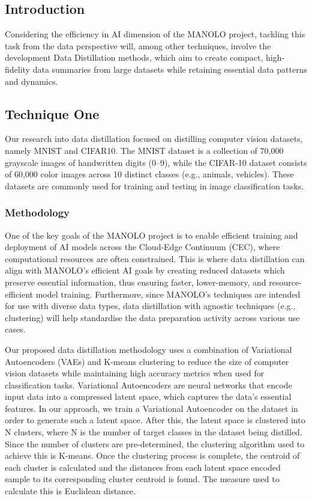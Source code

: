 \subsection{Introduction}
Considering the efficiency in AI dimension of the MANOLO project, tackling this task from the data perspective will, among other techniques, involve the development Data Distillation methods, which aim to create compact, high-fidelity data summaries from large datasets while retaining essential data patterns and dynamics.

\subsection{Technique One}
Our research into data distillation focused on distilling computer vision datasets, namely MNIST and CIFAR10. The MNIST dataset is a collection of 70,000 grayscale images of handwritten digits (0–9), while the CIFAR-10 dataset consists of 60,000 color images across 10 distinct classes (e.g., animals, vehicles). These datasets are commonly used for training and testing in image classification tasks.
\label{subsec:2.3_datdist_tech1}

\subsubsection{Methodology}

One of the key goals of the MANOLO project is to enable efficient training and deployment of AI models across the Cloud-Edge Continuum (CEC), where computational resources are often constrained. This is where data distillation can align with MANOLO’s efficient AI goals by creating reduced datasets which preserve essential information, thus ensuring faster, lower-memory, and resource-efficient model training. Furthermore, since MANOLO’s techniques are intended for use with diverse data types, data distillation with agnostic techniques (e.g., clustering) will help standardise the data preparation activity across various use cases. 

Our proposed data distillation methodology uses a combination of Variational Autoencoders (VAEs) and K-means clustering to reduce the size of computer vision datasets while maintaining high accuracy metrics when used for classification tasks. Variational Autoencoders are neural networks that encode input data into a compressed latent space, which captures the data's essential features. In our approach, we train a Variational Autoencoder on the dataset in order to generate such a latent space. After this, the latent space is clustered into N clusters, where N is the number of target classes in the dataset being distilled. Since the number of clusters are pre-determined, the clustering algorithm used to achieve this is K-means. Once the clustering process is complete, the centroid of each cluster is calculated and the distances from each latent space encoded sample to its corresponding cluster centroid is found. The measure used to calculate this is Euclidean distance. 

